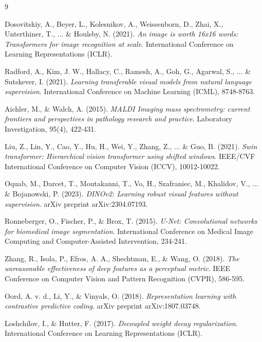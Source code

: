 \documentclass[12pt,a4paper]{article}
\begin{document}
\begin{thebibliography}{9}

Dosovitskiy, A., Beyer, L., Kolesnikov, A., Weissenborn, D., Zhai, X., Unterthiner, T., ... \& Houlsby, N. (2021).
\textit{An image is worth 16x16 words: Transformers for image recognition at scale}.
International Conference on Learning Representations (ICLR).

Radford, A., Kim, J. W., Hallacy, C., Ramesh, A., Goh, G., Agarwal, S., ... \& Sutskever, I. (2021).
\textit{Learning transferable visual models from natural language supervision}.
International Conference on Machine Learning (ICML), 8748-8763.

Aichler, M., \& Walch, A. (2015).
\textit{MALDI Imaging mass spectrometry: current frontiers and perspectives in pathology research and practice}.
Laboratory Investigation, 95(4), 422-431.

Liu, Z., Lin, Y., Cao, Y., Hu, H., Wei, Y., Zhang, Z., ... \& Guo, B. (2021).
\textit{Swin transformer: Hierarchical vision transformer using shifted windows}.
IEEE/CVF International Conference on Computer Vision (ICCV), 10012-10022.

Oquab, M., Darcet, T., Moutakanni, T., Vo, H., Szafraniec, M., Khalidov, V., ... \& Bojanowski, P. (2023).
\textit{DINOv2: Learning robust visual features without supervision}.
arXiv preprint arXiv:2304.07193.

Ronneberger, O., Fischer, P., \& Brox, T. (2015).
\textit{U-Net: Convolutional networks for biomedical image segmentation}.
International Conference on Medical Image Computing and Computer-Assisted Intervention, 234-241.

Zhang, R., Isola, P., Efros, A. A., Shechtman, E., \& Wang, O. (2018).
\textit{The unreasonable effectiveness of deep features as a perceptual metric}.
IEEE Conference on Computer Vision and Pattern Recognition (CVPR), 586-595.

Oord, A. v. d., Li, Y., \& Vinyals, O. (2018).
\textit{Representation learning with contrastive predictive coding}.
arXiv preprint arXiv:1807.03748.

Loshchilov, I., \& Hutter, F. (2017).
\textit{Decoupled weight decay regularization}.
International Conference on Learning Representations (ICLR).

\end{thebibliography}
\end{document}
